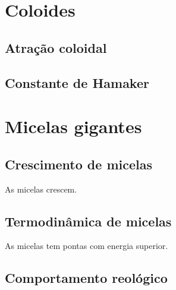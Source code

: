 	\chapter{Coloides}
		\section{Atração coloidal}
		\section{Constante de Hamaker}
	\chapter{Micelas gigantes}
		\label{chap:micelas_gigantes}
		\section{Crescimento de micelas}
		As micelas crescem.
		\section{Termodinâmica de micelas}
		As micelas tem pontas com energia superior.
		\section{Comportamento reológico}
